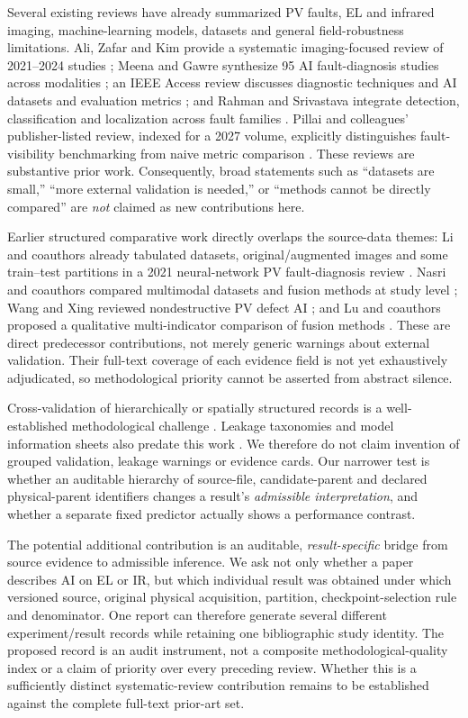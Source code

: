 \documentclass[10pt,a4paper]{article}
\begin{document}
Several existing reviews have already summarized PV faults, EL and infrared imaging, machine-learning models, datasets and general field-robustness limitations. Ali, Zafar and Kim provide a systematic imaging-focused review of 2021--2024 studies \cite{ali2026}; Meena and Gawre synthesize 95 AI fault-diagnosis studies across modalities \cite{meena2026}; an IEEE Access review discusses diagnostic techniques and AI datasets and evaluation metrics \cite{ieee2026}; and Rahman and Srivastava integrate detection, classification and localization across fault families \cite{rahman2026}. Pillai and colleagues' publisher-listed review, indexed for a 2027 volume, explicitly distinguishes fault-visibility benchmarking from naive metric comparison \cite{pillai2027}. These reviews are substantive prior work. Consequently, broad statements such as ``datasets are small,'' ``more external validation is needed,'' or ``methods cannot be directly compared'' are \emph{not} claimed as new contributions here.

Earlier structured comparative work directly overlaps the source-data themes: Li and coauthors already tabulated datasets, original/augmented images and some train--test partitions in a 2021 neural-network PV fault-diagnosis review \cite{li2021}. Nasri and coauthors compared multimodal datasets and fusion methods at study level \cite{nasri2026}; Wang and Xing reviewed nondestructive PV defect AI \cite{wangxing2026}; and Lu and coauthors proposed a qualitative multi-indicator comparison of fusion methods \cite{lu2026}. These are direct predecessor contributions, not merely generic warnings about external validation. Their full-text coverage of each evidence field is not yet exhaustively adjudicated, so methodological priority cannot be asserted from abstract silence.

Cross-validation of hierarchically or spatially structured records is a well-established methodological challenge \cite{roberts2017,varoquaux2018}. Leakage taxonomies and model information sheets also predate this work \cite{kapoor2023}. We therefore do not claim invention of grouped validation, leakage warnings or evidence cards. Our narrower test is whether an auditable hierarchy of source-file, candidate-parent and declared physical-parent identifiers changes a result's \emph{admissible interpretation}, and whether a separate fixed predictor actually shows a performance contrast.

The potential additional contribution is an auditable, \emph{result-specific} bridge from source evidence to admissible inference. We ask not only whether a paper describes AI on EL or IR, but which individual result was obtained under which versioned source, original physical acquisition, partition, checkpoint-selection rule and denominator. One report can therefore generate several different experiment/result records while retaining one bibliographic study identity. The proposed record is an audit instrument, not a composite methodological-quality index or a claim of priority over every preceding review. Whether this is a sufficiently distinct systematic-review contribution remains to be established against the complete full-text prior-art set.
\end{document}
